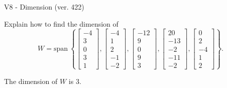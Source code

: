 \begin{exercise}
  \begin{exerciseTitle}V8 - Dimension (ver. 422)\end{exerciseTitle}
  \begin{exerciseStatement}
    Explain how to find the dimension of 
\[W=\mathrm{span}\ \left\{\left[\begin{array}{r}
-4 \\
3 \\
0 \\
3 \\
1
\end{array}\right] , \left[\begin{array}{r}
-4 \\
1 \\
2 \\
-1 \\
-2
\end{array}\right] , \left[\begin{array}{r}
-12 \\
9 \\
0 \\
9 \\
3
\end{array}\right] , \left[\begin{array}{r}
20 \\
-13 \\
-2 \\
-11 \\
-2
\end{array}\right] , \left[\begin{array}{r}
0 \\
2 \\
-4 \\
1 \\
2
\end{array}\right]\right\}.\]



  \end{exerciseStatement}
  \begin{exerciseAnswer}
   The dimension of \(W\) is  \(3\).
  


  \end{exerciseAnswer}
\end{exercise}